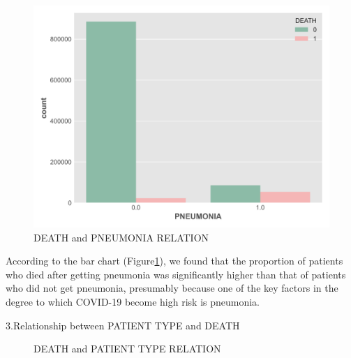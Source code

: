 \documentclass[
  journal=medium,
  manuscript=Report,
  year=2023,
  volume=37,
]{cup-journal}
\begin{document}
\begin{figure}[!hbtp]
    \centering
    \includegraphics[width=0.6\linewidth]{pic/DEATH_PNEUMONIA_RELATION.png}
    \caption{DEATH and PNEUMONIA RELATION}
    \label{DEATH_PNEUMONIA_RELATION}
\end{figure}

According to the bar chart (Figure\ref{DEATH_PNEUMONIA_RELATION}), we found that the proportion of patients who died after getting pneumonia was significantly higher than that of patients who did not get pneumonia, presumably because one of the key factors in the degree to which COVID-19 become high risk is pneumonia.

3.Relationship between PATIENT TYPE and DEATH

\begin{figure}[!htbp]
    \centering
    \hfill
    \caption{DEATH and PATIENT TYPE RELATION}
    \label{combine2}
\end{figure}
\end{document}
